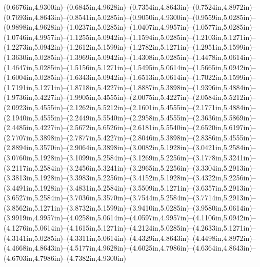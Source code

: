 (0.6676in,4.9300in)--(0.6845in,4.9628in)--(0.7354in,4.8643in)--(0.7524in,4.8972in)--(0.7693in,4.8643in)--(0.8541in,5.0285in)--(0.9050in,4.9300in)--(0.9559in,5.0285in)--(0.9898in,4.9628in)--(1.0237in,5.0285in)--(1.0407in,4.9957in)--(1.0577in,5.0285in)--(1.0746in,4.9957in)--(1.1255in,5.0942in)--(1.1594in,5.0285in)--(1.2103in,5.1271in)--(1.2273in,5.0942in)--(1.2612in,5.1599in)--(1.2782in,5.1271in)--(1.2951in,5.1599in)--(1.3630in,5.0285in)--(1.3969in,5.0942in)--(1.4308in,5.0285in)--(1.4478in,5.0614in)--(1.4647in,5.0285in)--(1.5156in,5.1271in)--(1.5495in,5.0614in)--(1.5665in,5.0942in)--(1.6004in,5.0285in)--(1.6343in,5.0942in)--(1.6513in,5.0614in)--(1.7022in,5.1599in)--(1.7191in,5.1271in)--(1.8718in,5.4227in)--(1.8887in,5.3898in)--(1.9396in,5.4884in)--(1.9736in,5.4227in)--(1.9905in,5.4555in)--(2.0075in,5.4227in)--(2.0584in,5.5212in)--(2.0923in,5.4555in)--(2.1262in,5.5212in)--(2.1601in,5.4555in)--(2.1771in,5.4884in)--(2.1940in,5.4555in)--(2.2449in,5.5540in)--(2.2958in,5.4555in)--(2.3636in,5.5869in)--(2.4485in,5.4227in)--(2.5672in,5.6526in)--(2.6181in,5.5540in)--(2.6520in,5.6197in)--(2.7707in,5.3898in)--(2.7877in,5.4227in)--(2.8046in,5.3898in)--(2.8386in,5.4555in)--(2.8894in,5.3570in)--(2.9064in,5.3898in)--(3.0082in,5.1928in)--(3.0421in,5.2584in)--(3.0760in,5.1928in)--(3.1099in,5.2584in)--(3.1269in,5.2256in)--(3.1778in,5.3241in)--(3.2117in,5.2584in)--(3.2456in,5.3241in)--(3.2965in,5.2256in)--(3.3304in,5.2913in)--(3.3813in,5.1928in)--(3.3983in,5.2256in)--(3.4152in,5.1928in)--(3.4322in,5.2256in)--(3.4491in,5.1928in)--(3.4831in,5.2584in)--(3.5509in,5.1271in)--(3.6357in,5.2913in)--(3.6527in,5.2584in)--(3.7036in,5.3570in)--(3.7544in,5.2584in)--(3.7714in,5.2913in)--(3.8562in,5.1271in)--(3.8732in,5.1599in)--(3.9410in,5.0285in)--(3.9580in,5.0614in)--(3.9919in,4.9957in)--(4.0258in,5.0614in)--(4.0597in,4.9957in)--(4.1106in,5.0942in)--(4.1276in,5.0614in)--(4.1615in,5.1271in)--(4.2124in,5.0285in)--(4.2633in,5.1271in)--(4.3141in,5.0285in)--(4.3311in,5.0614in)--(4.4329in,4.8643in)--(4.4498in,4.8972in)--(4.4668in,4.8643in)--(4.5177in,4.9628in)--(4.6025in,4.7986in)--(4.6364in,4.8643in)--(4.6703in,4.7986in)--(4.7382in,4.9300in) 